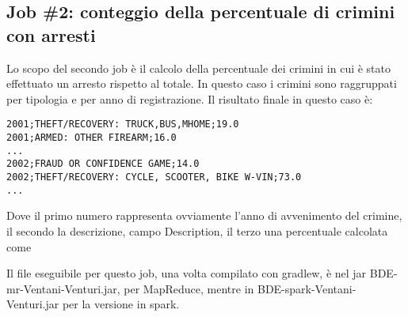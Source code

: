 \documentclass[10pt]{article}
\begin{document}
\subsection{Job \#2: conteggio della percentuale di crimini con arresti}
Lo scopo del secondo job è il calcolo della percentuale dei crimini in cui è stato effettuato un arresto rispetto al totale. In questo caso i crimini sono raggruppati per tipologia e per anno di registrazione.
Il risultato finale in questo caso è:
\begin{lstlisting}
2001;THEFT/RECOVERY: TRUCK,BUS,MHOME;19.0
2001;ARMED: OTHER FIREARM;16.0
...
2002;FRAUD OR CONFIDENCE GAME;14.0
2002;THEFT/RECOVERY: CYCLE, SCOOTER, BIKE W-VIN;73.0
...
\end{lstlisting}
Dove il primo numero rappresenta ovviamente l'anno di avvenimento del crimine, il secondo la descrizione, campo Description, il terzo una percentuale calcolata come

Il file eseguibile per questo job, una volta compilato con gradlew, è nel jar BDE-mr-Ventani-Venturi.jar, per MapReduce, mentre in BDE-spark-Ventani-Venturi.jar per la versione in spark. 
\end{document}
